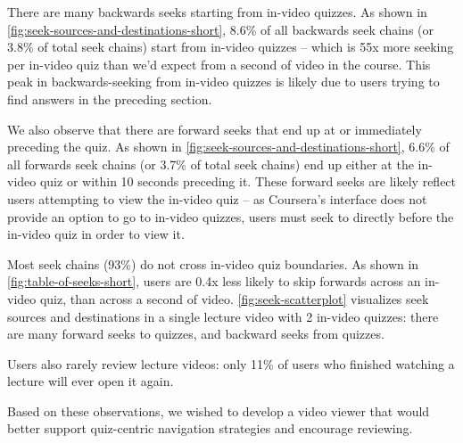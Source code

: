 \documentclass{sigchi}
\begin{document}

There are many backwards seeks starting from in-video quizzes. As shown in \autoref{fig:seek-sources-and-destinations-short}, 8.6\% of all backwards seek chains (or 3.8\% of total seek chains) start from in-video quizzes -- which is 55x more seeking per in-video quiz than we'd expect from a second of video in the course. This peak in backwards-seeking from in-video quizzes is likely due to users trying to find answers in the preceding section.

We also observe that there are forward seeks that end up at or immediately preceding the quiz. As shown in \autoref{fig:seek-sources-and-destinations-short}, 6.6\% of all forwards seek chains (or 3.7\% of total seek chains) end up either at the in-video quiz or within 10 seconds preceding it. These forward seeks are likely reflect users attempting to view the in-video quiz -- as Coursera's interface does not provide an option to go to in-video quizzes, users must seek to directly before the in-video quiz in order to view it.

Most seek chains (93\%) do not cross in-video quiz boundaries. As shown in \autoref{fig:table-of-seeks-short}, users are 0.4x less likely to skip forwards across an in-video quiz, than across a second of video. \autoref{fig:seek-scatterplot} visualizes seek sources and destinations in a single lecture video with 2 in-video quizzes: there are many forward seeks to quizzes, and backward seeks from quizzes.

Users also rarely review lecture videos: only 11\% of users who finished watching a lecture will ever open it again.

Based on these observations, we wished to develop a video viewer that would better support quiz-centric navigation strategies and encourage reviewing.


\end{document}
